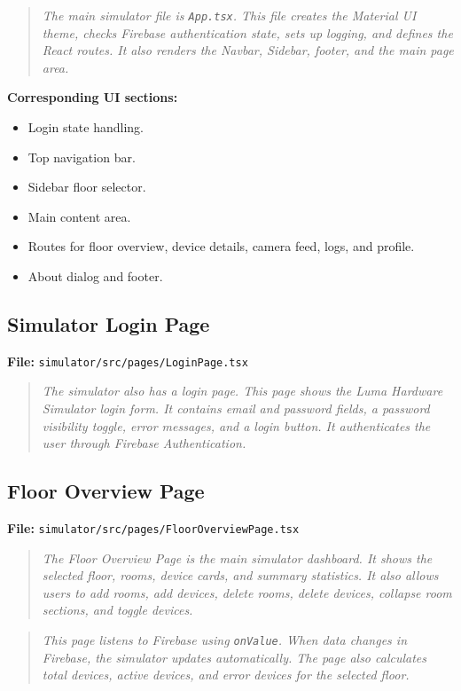 \documentclass[11pt,a4paper]{article}
\begin{document}
\begin{quote}
\textit{The main simulator file is \texttt{App.tsx}. This file creates the Material UI theme, checks Firebase authentication state, sets up logging, and defines the React routes. It also renders the Navbar, Sidebar, footer, and the main page area.}
\end{quote}

\textbf{Corresponding UI sections:}
\begin{itemize}
    \item Login state handling.
    \item Top navigation bar.
    \item Sidebar floor selector.
    \item Main content area.
    \item Routes for floor overview, device details, camera feed, logs, and profile.
    \item About dialog and footer.
\end{itemize}

\subsection{Simulator Login Page}
\textbf{File:} \texttt{simulator/src/pages/LoginPage.tsx}

\begin{quote}
\textit{The simulator also has a login page. This page shows the Luma Hardware Simulator login form. It contains email and password fields, a password visibility toggle, error messages, and a login button. It authenticates the user through Firebase Authentication.}
\end{quote}

\subsection{Floor Overview Page}
\textbf{File:} \texttt{simulator/src/pages/FloorOverviewPage.tsx}

\begin{quote}
\textit{The Floor Overview Page is the main simulator dashboard. It shows the selected floor, rooms, device cards, and summary statistics. It also allows users to add rooms, add devices, delete rooms, delete devices, collapse room sections, and toggle devices.}
\end{quote}

\begin{quote}
\textit{This page listens to Firebase using \texttt{onValue}. When data changes in Firebase, the simulator updates automatically. The page also calculates total devices, active devices, and error devices for the selected floor.}
\end{quote}
\end{document}
